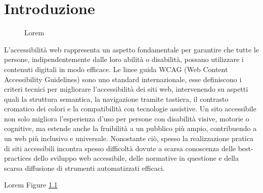 \chapter{Introduzione}
\label{chap:introduzione}

\begin{figure}[H]
    \centering
    \caption{Lorem}
    \label{fig:entanglement}
\end{figure}

L’accessibilità web rappresenta un aspetto fondamentale per garantire che tutte le persone, indipendentemente dalle loro abilità o disabilità, possano utilizzare i contenuti digitali in modo efficace. Le linee guida WCAG (Web Content Accessibility Guidelines) sono uno standard internazionale, esse definiscono i criteri tecnici per migliorare l’accessibilità dei siti web, intervenendo su aspetti quali la struttura semantica, la navigazione tramite tastiera, il contrasto cromatico dei colori e la compatibilità con tecnologie assistive. 
Un sito accessibile non solo migliora l’esperienza d’uso per persone con disabilità visive, motorie o cognitive, ma estende anche la fruibilità a un pubblico più ampio, contribuendo a un web più inclusivo e universale. 
Nonostante ciò, spesso la realizzazione pratica di siti accessibili incontra spesso difficoltà dovute a scarsa conoscenza delle best-practices dello sviluppo web accessibile, delle normative in questione e della scarsa diffusione di strumenti automatizzati efficaci.


Lorem Figure \ref{fig:entanglement}





